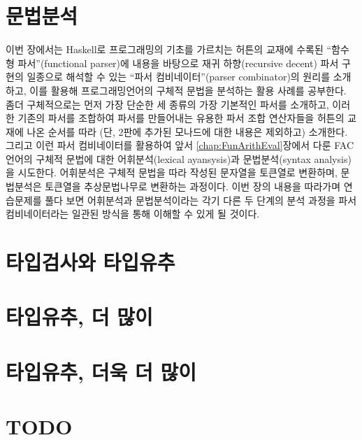 \chapter{문법분석}\label{chap:parser}
이번 장에서는 Haskell로 프로그래밍의 기초를 가르치는
허튼\cite{Hutton2016pih2nd}의 교재에 수록된
``함수형 파서''(functional parser)에 내용을 바탕으로
재귀 하향(recursive decent) 파서 구현의 일종으로 해석할 수 있는
``파서 컴비네이터''(parser combinator)의 원리를 소개하고,
이를 활용해 프로그래밍언어의 구체적 문법을 분석하는 활용 사례를 공부한다.
좀더 구체적으로는 먼저 가장 단순한 세 종류의 가장 기본적인 파서를 소개하고,
이러한 기존의 파서를 조합하여 파서를 만들어내는 유용한 파서 조합 연산자들을
허튼의 교재에 나온 순서를 따라 (단, 2판에 추가된 모나드에 대한
내용은 제외하고) 소개한다. 그리고 이런 파서 컴비네이터를 활용하여
앞서 \ref{chap:FunArithEval}장에서 다룬 FAC언어의 구체적 문법에 대한
어휘분석(lexical ayansysis)과 문법분석(syntax analysis)을 시도한다.
어휘분석은 구체적 문법을 따라 작성된 문자열을 토큰열로 변환하며,
문법분석은 토큰열을 추상문법나무로 변환하는 과정이다.
이번 장의 내용을 따라가며 연습문제를 풀다 보면
어휘분석과 문법분석이라는 각기 다른 두 단계의 분석 과정을
파서 컴비네이터라는 일관된 방식을 통해 이해할 수 있게 될 것이다.
\newpage


\chapter{타입검사와 타입유추}\label{chap:TyChk}


\chapter{타입유추, 더 많이}\label{chap:TyInf}


\chapter{타입유추, 더욱 더 많이}\label{chap:TyInfMore}


\chapter{TODO}


